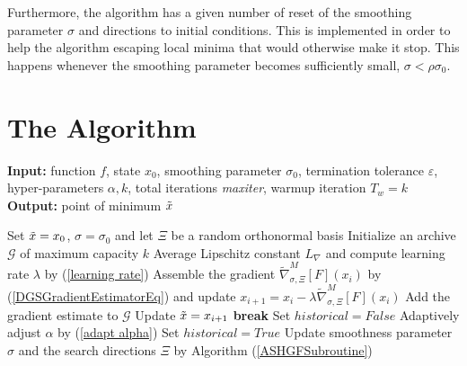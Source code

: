 Furthermore, the algorithm has a given number of reset of the smoothing parameter $\sigma$ and directions to initial conditions. This is implemented in order to help the algorithm escaping local minima that would otherwise make it stop. This happens whenever the smoothing parameter becomes sufficiently small, $\sigma < \rho \sigma_0$.


\section{The Algorithm}\label{sect:2_4} 

\begin{algorithm}[!ht]
\caption{ASHGF algorithm}\label{ASHGF}

\hspace*{\algorithmicindent} \textbf{Input:} function $f$, state $x_0$, smoothing parameter $\sigma_0$, termination tolerance $\varepsilon$, hyper-parameters $\alpha, k$, total iterations \textit{maxiter}, warmup iteration $T_w = k$\\
\hspace*{\algorithmicindent} \textbf{Output:} point of minimum $\Tilde{x}$
\begin{algorithmic}[1]

\State Set $\Tilde{x} = x_0$, $\sigma = \sigma_0$ and let $\Xi$ be a random orthonormal basis
\State Initialize an archive $\mathcal{G}$ of maximum capacity $k$
        \State {}
    \EndFor
    \State Average Lipschitz constant $L_\nabla$ and compute learning rate $\lambda$ by (\ref{learning rate})
    \State Assemble the gradient $ \widetilde{\nabla}_{\sigma, \Xi}^{M}[F](x_i) $ by (\ref{DGSGradientEstimatorEq}) and update $ x_{i+1}=x_{i}-\lambda \widetilde{\nabla}_{\sigma, \Xi}^{M}[F](x_i) $
    \State Add the gradient estimate to $\mathcal{G}$
        \State Update $\Tilde{x} = x_{i+1}$
    \EndIf
        \State \textbf{break}
    \Else
            \State Set $historical = False$
        \Else
                \State Adaptively adjust $\alpha$ by (\ref{adapt alpha})
            \EndIf
            \State Set $historical = True$
        \EndIf
        \State Update smoothness parameter $\sigma$ and the search directions $\Xi$ by Algorithm (\ref{ASHGFSubroutine})
    \EndIf
\EndFor

\end{algorithmic}
\end{algorithm}

